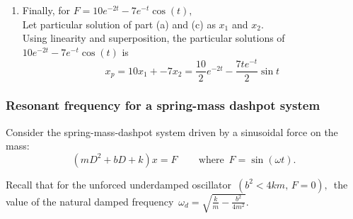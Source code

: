 \begin{enumerate}
\begin{enumerate}[label=(\alph*)]
  \item Finally, for $F=10 e^{-2t}- 7e^{-t}\cos (t),\,$\\
    Let particular solution of part (a) and (c) as $x_1$ and $x_2$. \\
    Using linearity and superposition, the particular solutions
    of $10 e^{-2t}- 7e^{-t}\cos (t)$ is
    \begin{equation*}
      x_ p = 10 x_1 + -7 x_2
      =  \frac{10}{2} e^{-2t} -  \frac{7te^{-t}}{2} \sin t
    \end{equation*}    
  \end{enumerate}
\end{enumerate}
\clearpage

\subsubsection{Resonant frequency for a spring-mass dashpot system}

Consider the spring-mass-dashpot system driven by a sinusoidal force on the mass:
\begin{equation*}
  \left(mD^2+bD+k\right) x= F\, \qquad \text {where }\,  F=\sin (\omega t) .
\end{equation*}

Recall that for the unforced underdamped oscillator $\, (b^2<4km, \, F=0),\,$
the value of the natural damped frequency
$\, \displaystyle \omega _ d= \sqrt {\frac{k}{m}-\frac{b^2}{4m^2}}.$\\

